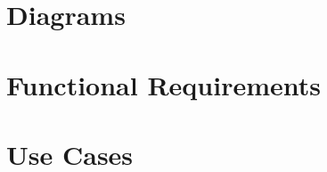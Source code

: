 \documentclass[11pt,a5paper,footinclude=true,headinclude=true]{report} %
\begin{document}
  

	\tableofcontents 


  
  
\part{Diagrams}    



\part{Functional Requirements}







\part{Use Cases}


\end{document}
